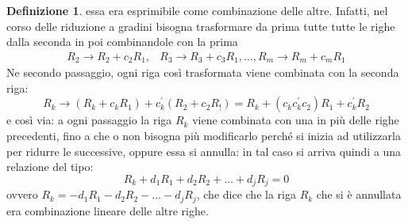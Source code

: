\documentclass{book}
\theoremstyle{definition}
\newtheorem{defi}{Definizione}[section]
\theoremstyle{plain}
\begin{document}
\begin{defi}
  essa era esprimibile come combinazione delle altre. Infatti, nel corso
  delle riduzione a gradini bisogna trasformare da prima tutte tutte le
  righe dalla seconda in poi combinandole con la prima
  \begin{equation*}
    \begin{matrix}
      R_2\to R_2+c_2R_1, & R_3\to R_3+c_3R_1,\dots,R_m \to R_m+c_mR_1
    \end{matrix}
  \end{equation*}
  Ne secondo passaggio, ogni riga così trasformata viene combinata con la
  seconda riga:
  \begin{equation*}
    R_k\to (R_k+c_kR_1)+c_k^\prime(R_2+c_2R_!)=R_k+(c_kc^\prime_kc_2)R_1
    +c_k^\prime R_2
  \end{equation*}
  e così via: a ogni passaggio la riga $R_k$ viene combinata con una in
  più delle righe precedenti, fino a che o non bisogna più modificarlo
  perché si inizia ad utilizzarla per ridurre le successive, oppure essa
  si annulla: in tal caso si arriva quindi a una relazione del tipo:
  \begin{equation*}
    R_k+d_1R_1+d_2R_2+\dots+d_jR_j=0
  \end{equation*}
  ovvero $R_k=-d_1R_1-d_2R_2-\dots-d_jR_j$, che dice che la riga $R_k$ che
  si è annullata era combinazione lineare delle altre righe.
\end{defi}
\end{document}

